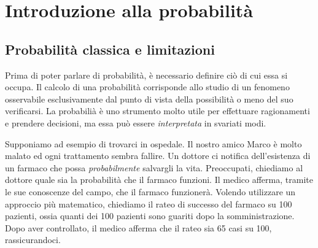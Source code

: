 \documentclass[a4paper, 12pt]{report}
\institute{\curlyquotes{\hspace{0.25mm}Sapienza} Università di Roma}
\subtitle{Appunti integrati con il libro \book}
\author{\textit{Autore}\\\authorName}
\institute{\curlyquotes{\hspace{0.25mm}Sapienza} University of Rome}
\subtitle{Lecture notes integrated with the book \book}
\author{\textit{Author}\\\authorName}
\title{\courseName}
\date{\today}
\begin{document}
    \maketitle

    {
        \hypersetup{allcolors=black}

        \romantableofcontents
    }

    \introduction

    \chapter{Introduzione alla probabilità}

    \section{Probabilità classica e limitazioni}

    Prima di poter parlare di probabilità, è necessario definire ciò di cui essa si occupa. Il calcolo di una probabilità corrisponde allo studio di un fenomeno osservabile esclusivamente dal punto di vista della possibilità o meno del suo verificarsi. La probabilià è uno strumento molto utile per effettuare ragionamenti e prendere decisioni, ma essa può essere \textit{interpretata} in svariati modi.

    Supponiamo ad esempio di trovarci in ospedale. Il nostro amico Marco è molto malato ed ogni trattamento sembra fallire. Un dottore ci notifica dell'esistenza di un farmaco che possa \textit{probabilmente} salvargli la vita. Preoccupati, chiediamo al dottore quale sia la probabilità che il farmaco funzioni. Il medico afferma, tramite le sue conoscenze del campo, che  il farmaco funzionerà. Volendo utilizzare un approccio più matematico, chiediamo il rateo di successo del farmaco su 100 pazienti, ossia quanti dei 100 pazienti sono guariti dopo la somministrazione. Dopo aver controllato, il medico afferma che il rateo sia 65 casi su 100, rassicurandoci.
\end{document}

